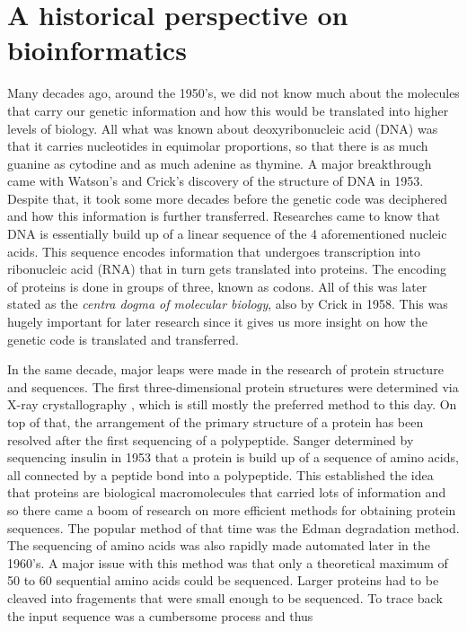 \chapter[A historical perspective on bioinformatics]%
{A historical perspective on bioinformatics}
Many decades ago, around the 1950's, we did not know much about the molecules that carry our genetic information and how this would be translated into higher levels of biology. All what was known about deoxyribonucleic acid (DNA) was that it carries nucleotides in equimolar proportions, so that there is as much guanine as cytodine and as much adenine as thymine. A major breakthrough came with Watson's and Crick's discovery of the structure of DNA in 1953\cite{dnastruct}. Despite that, it took some more decades before the genetic code was deciphered and how this information is further transferred. Researches came to know that DNA is essentially build up of a linear sequence of the 4 aforementioned nucleic acids. This sequence encodes information that undergoes transcription into ribonucleic acid (RNA) that in turn gets translated into proteins. The encoding of proteins is done in groups of three, known as codons. All of this was later stated as the \textit{centra dogma of molecular biology}, also by Crick in 1958\cite{dogma}. This was hugely important for later research since it gives us more insight on how the genetic code is translated and transferred.

In the same decade, major leaps were made in the research of protein structure and sequences. The first three-dimensional protein structures were determined via X-ray crystallography \cite{xray}, which is still mostly the preferred method to this day. On top of that, the arrangement of the primary structure of a protein has been resolved after the first sequencing of a polypeptide. Sanger determined by sequencing insulin in 1953\cite{insulin} that a protein is build up of a sequence of amino acids, all connected by a peptide bond into a polypeptide. This established the idea that proteins are biological macromolecules that carried lots of information \cite{primstruct} and so there came a boom of research on more efficient methods for obtaining protein sequences. The popular method of that time was the Edman degradation method. The sequencing of amino acids was also rapidly made automated later in the 1960's. A major issue with this method was that only a theoretical maximum of 50 to 60 sequential amino acids could be sequenced. Larger proteins had to be cleaved into fragements that were small enough to be sequenced. To trace back the input sequence was a cumbersome process and thus 